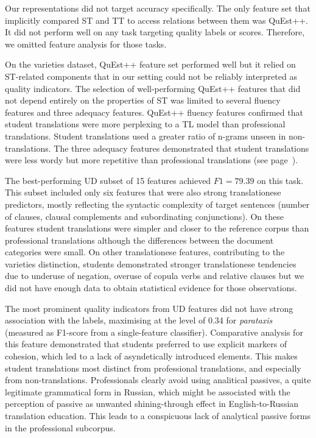 Our representations did not target accuracy specifically. The only feature set that implicitly compared ST and TT to access relations between them was QuEst++. It did not perform well on any task targeting quality labels or scores. Therefore, we omitted feature analysis for those tasks.

On the varieties dataset, QuEst++ feature set performed well but it relied on ST-related components that in our setting could not be reliably interpreted as quality indicators. 
The selection of well-performing QuEst++ features that did not depend entirely on the properties of ST was limited to several fluency features and three adequacy features. QuEst++ fluency features confirmed that student translations were more perplexing to a TL model than professional translations. Student translations used a greater ratio of n-grams unseen in non-translations. The three adequacy features demonstrated that student translations were less wordy but more repetitive than professional translations (see page~\pageref{pg:quest_adequacy_feats_for_vars}).

The best-performing UD subset of 15 features achieved $F1=79.39$ on this task. This subset included only six features that were also strong translationese predictors, mostly reflecting the syntactic complexity of target sentences (number of clauses, clausal complements and subordinating conjunctions). On these features student translations were simpler and closer to the reference corpus than professional translations although the differences between the document categories were small. On other translationese features, contributing to the varieties distinction, students demonstrated stronger translationese tendencies due to underuse of negation, overuse of copula verbs and relative clauses but we did not have enough data to obtain statistical evidence for those observations. 

The most prominent quality indicators from UD features did not have strong association with the labels, maximising at the level of 0.34 for \textit{parataxis} (measured as F1-score from a single-feature classifier). Comparative analysis for this feature demonstrated that students preferred to use explicit markers of cohesion, which led to a lack of asyndetically introduced elements. This makes student translations most distinct from professional translations, and especially from non-translations.
Professionals clearly avoid using analitical passives, a quite legitimate grammatical form in Russian, which might be associated with the perception of passive as unwanted shining-through effect in English-to-Russian translation education. This leads to a conspicuous lack of analytical passive forms in the professional subcorpus. 

